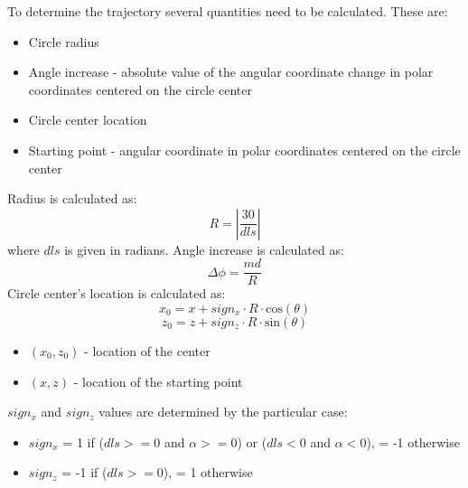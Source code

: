 	To determine the trajectory several quantities need to be calculated. These are:
	\begin{itemize}
		\item Circle radius
		\item Angle increase - absolute value of the angular coordinate change in polar coordinates centered on the circle center
		\item Circle center location
		\item Starting point - angular coordinate in polar coordinates centered on the circle center
	\end{itemize}
	Radius is calculated as:
	\begin{equation}
		R = \left|\frac{30} {dls}\right|
	\end{equation}
	where $dls$ is given in radians.\newline
	Angle increase is calculated as:
	\begin{equation}
		\Delta \phi = \frac{md}{R}
	\end{equation}
	Circle center's location is calculated as:
	\begin{equation}
		x_0 = x + sign_x \cdot R \cdot \mathrm{cos}(\theta)
	\end{equation}
	\begin{equation}
		z_0 = z + sign_z \cdot R \cdot \mathrm{sin}(\theta)
	\end{equation}
	\begin{itemize}
		\item $(x_0, z_0)$ - location of the center
		\item $(x, z)$ - location of the starting point
	\end{itemize}
	$sign_x$ and $sign_z$ values are determined by the particular case:

	\begin{itemize}
		\item $sign_x$ = 1 if ($dls >=0$ and $\alpha >= 0$) or ($dls < 0$ and $\alpha < 0$), = -1 otherwise
		\item $sign_z$ = -1 if ($dls >= 0$), = 1 otherwise
	\end{itemize}


